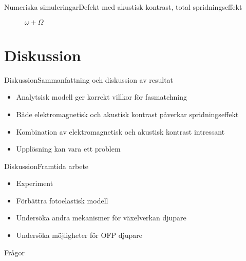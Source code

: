 \documentclass[11pt, final]{beamer}
\begin{document}
	\begin{frame}{Numeriska simuleringar}{Defekt med akustisk kontrast, total spridningseffekt}
		\begin{figure}
			\centering
			\resizebox{!}{0.8\textheight}{}
			\caption*{$\omega + \Omega$}
		\end{figure}
	\end{frame}
	
	\section{Diskussion}
	
	\begin{frame}{Diskussion}{Sammanfattning och diskussion av resultat}
		\begin{itemize}
			\item Analytsisk modell ger korrekt villkor för fasmatchning
			\pause
			\item Både elektromagnetisk och akustisk kontrast påverkar spridningseffekt
			\pause
			\item Kombination av elektromagnetisk och akustisk kontrast intressant
			\pause
			\item Upplösning kan vara ett problem
		\end{itemize}
	\end{frame}
	
	\begin{frame}{Diskussion}{Framtida arbete}
		\begin{itemize}
			\item Experiment
			\pause
			\item Förbättra fotoelastisk modell
			\pause
			\item Undersöka andra mekanismer för växelverkan djupare
			\pause
			\item Undersöka möjligheter för OFP djupare
		\end{itemize}
	\end{frame}
	
	\begin{frame}
		\centering \huge
		Frågor
	\end{frame}
\end{document}
